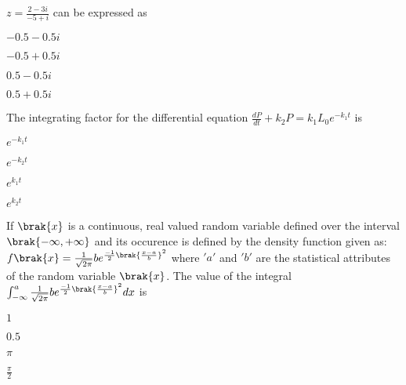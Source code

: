 \item $ z = \frac{2 - 3 i}{-5 + i}$ can be expressed as
\begin{enumerate}
\begin{multicols}{2}
\item $ -0.5 - 0.5i $
\item $-0.5 + 0.5i$
\item $0.5 - 0.5i$
\item $0.5 + 0.5i$
\end{multicols}
\end{enumerate}

\item The integrating factor for the differential equation $\frac{dP}{dt} + k_{2}P = k_{1}L_{0} e^{-k_{1}t}$ is 
\begin{enumerate}
\begin{multicols}{4}
\item $e^{-k_{1}t}$
\item $e^{-k_{2}t}$
\item $e^{k_{1}t}$
\item $e^{k_{2}t}$
\end{multicols}
\end{enumerate}

\item If $\brak{x}$ is a continuous, real valued random variable defined over the interval $\brak{-\infty, + \infty}$ and its occurence is defined by the density function given as: $f\brak{x} = \frac{1}{\sqrt{2 \pi}}b e^{\frac{-1}{2} {\brak{\frac{x - a}{b}}}^{2}}$ where $'a'$ and $'b'$ are the statistical attributes of the random variable $\brak{x}$. The value of the integral $\int_{-\infty}^{a} \frac{1}{\sqrt{2 \pi}}b e^{\frac{-1}{2} {\brak{\frac{x - a}{b}}}^{2}} dx$ is 

\begin{enumerate}
\begin{multicols}{4}
\item $1$
\item $0.5$
\item $\pi$
\item $\frac{\pi}{2}$
\end{multicols}
\end{enumerate}


